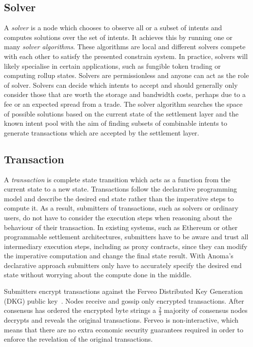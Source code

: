 \documentclass[
    9pt,            %
    commun,        %
    affiltop,       %
]{art}
\begin{document}
\subsection{Solver}\label{solver}

A \emph{solver} is a node which chooses to observe all or a subset of
intents and computes solutions over the set of intents. It achieves this
by running one or many \emph{solver algorithms}. These algorithms are
local and different solvers compete with each other to satisfy the
presented constrain system. In practice, solvers will likely specialise
in certain applications, such as fungible token trading or computing
rollup states. Solvers are permissionless and anyone can act as the role
of solver. Solvers can decide which intents to accept and should
generally only consider those that are worth the storage and bandwidth
costs, perhaps due to a fee or an expected spread from a trade. The
solver algorithm searches the space of possible solutions based on the
current state of the settlement layer and the known intent pool with the
aim of finding subsets of combinable intents to generate transactions
which are accepted by the settlement layer.

\subsection{Transaction}\label{transaction}

A \emph{transaction} is complete state transition which acts as a
function from the current state to a new state. Transactions follow the
declarative programming model and describe the desired end state rather
than the imperative steps to compute it. As a result, submitters of
transactions, such as solvers or ordinary users, do not have to consider
the execution steps when reasoning about the behaviour of their
transaction. In existing systems, such as Ethereum or other programmable
settlement architectures, submitters have to be aware and trust all
intermediary execution steps, including as proxy contracts, since they
can modify the imperative computation and change the final state result.
With Anoma's declarative approach submitters only have
to accurately specify the desired end state without worrying about the
compute done in the middle.

Submitters encrypt transactions against the Ferveo Distributed Key
Generation (DKG) public key~\cite{bebel2022ferveo}. Nodes receive and
gossip only encrypted transactions. After consensus has ordered the
encrypted byte strings a $\frac{2}{3}$ majority of
consensus nodes decrypts and reveals the original transactions. Ferveo
is non-interactive, which means that there are no extra economic
security guarantees required in order to enforce the revelation of the
original transactions.
\end{document}
